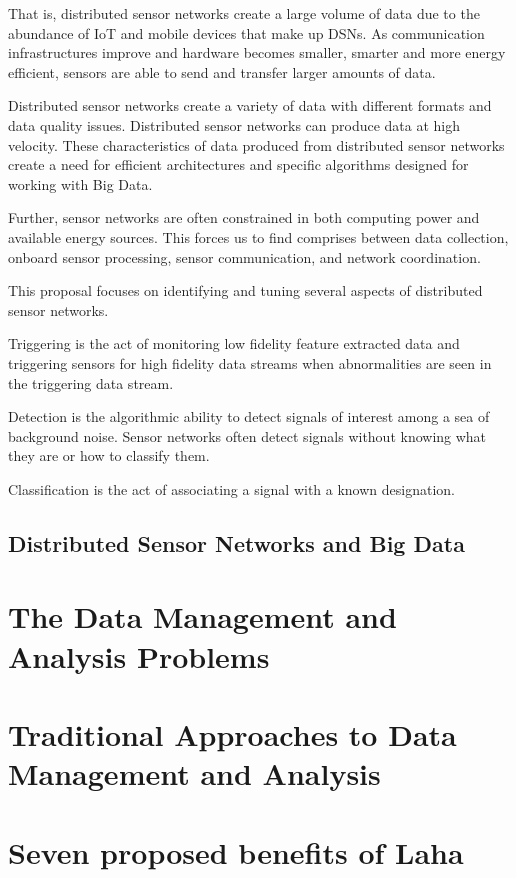 That is, distributed sensor networks create a large volume of data due to the abundance of IoT and mobile devices that make up DSNs. As communication infrastructures improve and hardware becomes smaller, smarter and more energy efficient, sensors are able to send and transfer larger amounts of data.

Distributed sensor networks create a variety of data with different formats and data quality issues. Distributed sensor networks can produce data at high velocity. These characteristics of data produced from distributed sensor networks create a need for efficient architectures and specific algorithms designed for working with Big Data.

Further, sensor networks are often constrained in both computing power and available energy sources. This forces us to find comprises between data collection, onboard sensor processing, sensor communication, and network coordination.

This proposal focuses on identifying and tuning several aspects of distributed sensor networks.

Triggering is the act of monitoring low fidelity feature extracted data and triggering sensors for high fidelity data streams when abnormalities are seen in the triggering data stream.

Detection is the algorithmic ability to detect signals of interest among a sea of background noise. Sensor networks often detect signals without knowing what they are or how to classify them. 

Classification is the act of associating a signal with a known designation. 

\subsection{Distributed Sensor Networks and Big Data}

\section{The Data Management and Analysis Problems}

\section{Traditional Approaches to Data Management and Analysis}

\section{Seven proposed benefits of Laha} \label{laha-benefits}
